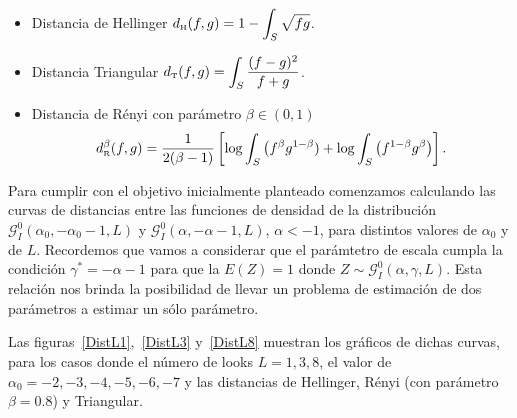\begin{itemize}
	\label{dist}
	\item Distancia de Hellinger $d_\text{\tiny H}(f,g)=1-\displaystyle{\int_{S}\sqrt{f g}}$.
	
	
	\item Distancia Triangular $d_\text{\tiny T}(f,g)=\displaystyle{\int_{S}\frac{(f-g)^2}{f+g}}$.
	
	\item Distancia de R\'enyi con parámetro $\beta\in(0,1)$
	$$
	d_\text{\tiny R}^{\beta}(f,g)=\frac{1}{2(\beta-1)}\left[\log\displaystyle{\int_{S}\big({f^{\beta}g^{1-\beta})}+\log\displaystyle{\int_{S}\big(f^{1-\beta}g^{\beta}}}\big)\right].
	$$
\end{itemize}

Para cumplir con el objetivo inicialmente planteado comenzamos calculando las curvas de distancias entre las funciones de densidad de la distribución $\mathcal G_I^0(\alpha_0, -\alpha_0-1, L)$ y $\mathcal G_I^0(\alpha,-\alpha-1,L)$, $\alpha<-1$, para distintos valores de $\alpha_0$ y de $L$. Recordemos que vamos a considerar que el parámtetro de escala cumpla la condición $\gamma^*=-\alpha-1$ para que la $E(Z)=1$ donde $Z \sim \mathcal{G}_I^0(\alpha,\gamma,L)$. Esta relación nos brinda la posibilidad de llevar un problema de estimación de dos parámetros a estimar un sólo parámetro. 

Las figuras~\ref{DistL1},~\ref{DistL3} y~\ref{DistL8} muestran los gráficos de dichas curvas, para los casos donde el número de looks $L=1,3,8$, el valor de $\alpha_0= -2,-3,-4,-5,-6,-7$ y las distancias de Hellinger, Rényi (con parámetro $\beta=0.8$) y Triangular. 

